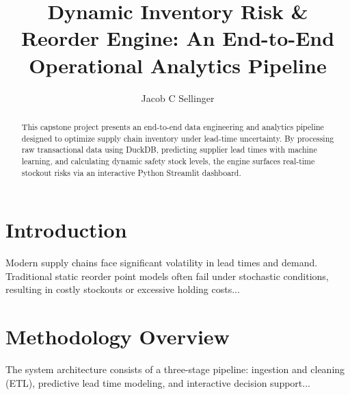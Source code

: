\documentclass[runningheads]{llncs}
\begin{document}
\title{Dynamic Inventory Risk \& Reorder Engine: An End-to-End Operational Analytics Pipeline}


\author{Jacob C Sellinger }



\maketitle              %

\begin{abstract}
This capstone project presents an end-to-end data engineering and analytics pipeline designed to optimize supply chain inventory under lead-time uncertainty. By processing raw transactional data using DuckDB, predicting supplier lead times with machine learning, and calculating dynamic safety stock levels, the engine surfaces real-time stockout risks via an interactive Python Streamlit dashboard.


\end{abstract}


\section{Introduction}
Modern supply chains face significant volatility in lead times and demand. Traditional static reorder point models often fail under stochastic conditions, resulting in costly stockouts or excessive holding costs...

\section{Methodology Overview}
The system architecture consists of a three-stage pipeline: ingestion and cleaning (ETL), predictive lead time modeling, and interactive decision support...
\end{document}
